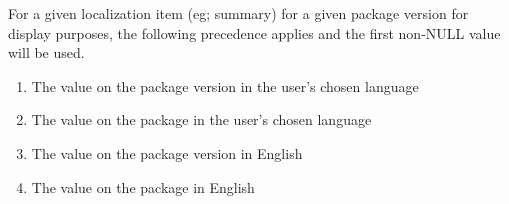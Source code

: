 For a given localization item (eg; summary) for a given package version for display purposes, the following precedence applies and the first non-NULL value will be used.

\begin{enumerate}
\item The value on the package version in the user's chosen language
\item The value on the package in the user's chosen language
\item The value on the package version in English
\item The value on the package in English
\end{enumerate}

